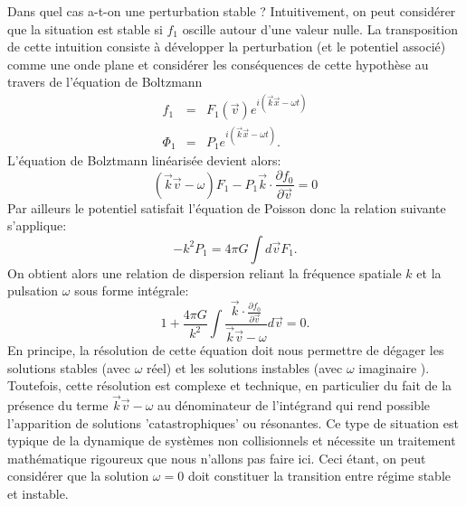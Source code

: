 Dans quel cas a-t-on une perturbation stable ? Intuitivement, on peut considérer que la situation est stable si $f_1$ oscille autour d'une valeur nulle. La transposition de cette intuition consiste à développer la perturbation (et le potentiel associé) comme une onde plane et considérer les conséquences de cette hypothèse au travers de l'équation de Boltzmann
\begin{eqnarray}
f_1&=&F_1(\vec{v})e^{i(\vec{k}\vec{x}-\omega t)}\\
\Phi_1&=&P_1e^{i(\vec{k}\vec{x}-\omega t)}.
\end{eqnarray}
L'équation de Bolztmann linéarisée devient alors:
\begin{equation}
(\vec{k}\vec{v}-\omega )F_1-P_1\vec{k}\cdot\frac{\partial f_0}{\partial \vec{v}}=0
\end{equation}
Par ailleurs le potentiel satisfait l'équation de Poisson donc la relation suivante s'applique:
\begin{equation}
-k^2 P_1=4\pi G \int d\vec{v} F_1.
\end{equation}
On obtient alors une relation de dispersion reliant la fréquence spatiale $k$ et la pulsation $\omega$ sous forme intégrale:
\begin{equation}
1+\frac{4\pi G}{k^2}\int \frac{\vec{k}\cdot\frac{\partial f_0}{\partial \vec{v}}}{\vec{k}\vec{v}-\omega}d\vec{v}=0.
\end{equation}
En principe, la résolution de cette équation doit nous permettre de dégager les solutions stables (avec $\omega$ réel) et les solutions instables (avec $\omega$ imaginaire ). Toutefois, cette résolution est complexe et technique, en particulier du fait de la présence du terme $\vec{k}\vec{v}-\omega$ au dénominateur de l'intégrand qui rend possible l'apparition de solutions 'catastrophiques' ou résonantes. Ce type de situation est typique de la dynamique de systèmes non collisionnels et nécessite un traitement mathématique rigoureux que nous n'allons pas faire ici. Ceci étant, on peut considérer que la solution $\omega=0$ doit constituer la transition entre régime stable et instable.

